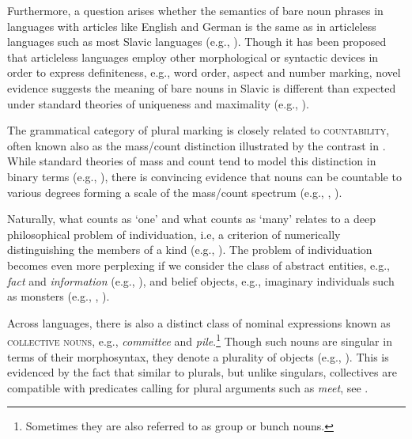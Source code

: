 \documentclass[output=paper]{langscibook}
\begin{document}
\noindent Furthermore, a question arises whether the semantics of bare noun phrases in languages with articles like English and German is the same as in articleless languages such as most Slavic languages (e.g., \citealt{geist2010bare, heim2011definiteness}). Though it has been proposed that articleless languages employ other morphological or syntactic devices in order to express definiteness, e.g., word order, aspect and number marking, novel evidence suggests the meaning of bare nouns in Slavic is different than expected under standard theories of uniqueness and maximality (e.g., ).

The grammatical category of plural marking is closely related to \textsc{countability}, often known also as the mass/count distinction illustrated by the contrast in . While standard theories of mass and count tend to model this distinction in binary terms (e.g., \citealt{link1983logical, chierchia1998plurality, chierchia2010mass}), there is convincing evidence that nouns can be countable to various degrees forming a scale of the mass/count spectrum (e.g., \citealt{allan1980nouns}, ). 

\ea\label{doc-wag:ex:countability}
\z 
\z 

\noindent Naturally, what counts as `one' and what counts as `many' relates to a deep philosophical problem of individuation, i.e, a criterion of numerically distinguishing the members of a kind (e.g., \citealt{grimm2012number, wagiel2018subatomic}). The problem of individuation becomes even more perplexing if we consider the class of abstract entities, e.g., \textit{fact} and \textit{information} (e.g., \citealt{grimm2014individuating, sutton2020informational}), and belief objects, e.g., imaginary individuals such as monsters (e.g., \citealt{geach1967intentional}, ).

Across languages, there is also a distinct class of nominal expressions known as \textsc{collective nouns}, e.g., \textit{committee} and \textit{pile}.\footnote{Sometimes they are also referred to as group or bunch nouns.} Though such nouns are singular in terms of their morphosyntax, they denote a plurality of objects (e.g., \citealt{landman1989groupsi, barker1992group, pearson2011new, henderson2017swarms}). This is evidenced by the fact that similar to plurals, but unlike singulars, collectives are compatible with predicates calling for plural arguments such as \textit{meet}, see .
\end{document}
